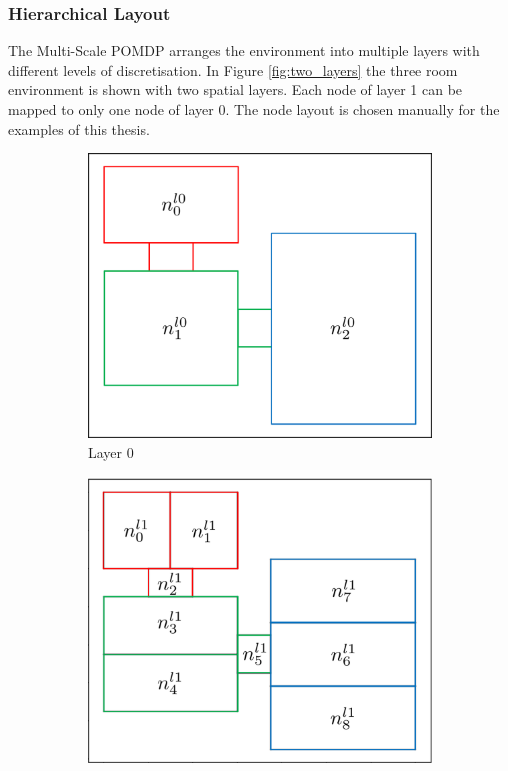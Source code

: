 \subsubsection{Hierarchical Layout}
The Multi-Scale POMDP arranges the environment into multiple layers with different levels of discretisation. In Figure \ref{fig:two_layers} the three room environment is shown with two spatial layers. Each node of layer 1 can be mapped to only one node of layer 0. The node layout is chosen manually for the examples of this thesis. 
\begin{figure}
    \centering
    \begin{subfigure}[b]{0.48\textwidth}
        \includegraphics[width=\textwidth]{Report/images/layer0_b.png}
        \caption[t]{Layer 0}
        \label{subfig:l0}
    \end{subfigure}
    \hfill
    \begin{subfigure}[b]{0.48\textwidth}
        \includegraphics[width=\textwidth]{Report/images/layer1.png}

\end{subfigure}
\end{figure}
